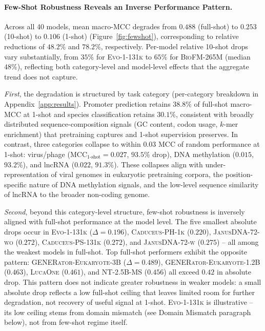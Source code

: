\documentclass{article}
\theoremstyle{plain}
\theoremstyle{definition}
\theoremstyle{remark}
\begin{document}
\paragraph{Few-Shot Robustness Reveals an Inverse Performance Pattern.}
Across all 40 models, mean macro-MCC degrades from $0.488$
(full-shot) to $0.253$ (10-shot) to $0.106$ (1-shot)
(Figure~\ref{fig:fewshot}), corresponding to relative reductions of
$48.2\%$ and $78.2\%$, respectively. Per-model relative 10-shot
drops vary substantially, from $35\%$ for \textsc{Evo-1-131k} to
$65\%$ for \textsc{BioFM-265M} (median $48\%$), reflecting both
category-level and model-level effects that the aggregate trend
does not capture.

\textit{First}, the degradation is structured by task category
(per-category breakdown in Appendix~\ref{app:results}). Promoter
prediction retains $38.8\%$ of full-shot macro-MCC at 1-shot and
species classification retains $30.1\%$, consistent with broadly
distributed sequence-composition signals (GC content, codon usage,
$k$-mer enrichment) that pretraining captures and 1-shot
supervision preserves. In contrast, three categories collapse to
within $0.03$ MCC of random performance at 1-shot: virus/phage
($\text{MCC}_{\text{1-shot}}=0.027$, $93.5\%$ drop), DNA methylation
($0.015$, $93.2\%$), and lncRNA ($0.022$, $91.3\%$). These collapses
align with under-representation of viral genomes in eukaryotic
pretraining corpora, the position-specific nature of DNA methylation
signals, and the low-level sequence similarity of lncRNA to the
broader non-coding genome.

\textit{Second}, beyond this category-level structure, few-shot
robustness is inversely aligned with full-shot performance at the
model level. The five smallest absolute drops occur in
\textsc{Evo-1-131k} ($\Delta = 0.196$), \textsc{Caduceus-PH-1k}
($0.220$), \textsc{JanusDNA-72-wo} ($0.272$),
\textsc{Caduceus-PS-131k} ($0.272$), and \textsc{JanusDNA-72-w}
($0.275$) -- all among the weakest models in full-shot. Top
full-shot performers exhibit the opposite pattern:
\textsc{GENERator-Eukaryote-3B} ($\Delta=0.489$),
\textsc{GENERator-Eukaryote-1.2B} ($0.463$), \textsc{LucaOne}
($0.461$), and \textsc{NT-2.5B-MS} ($0.456$) all exceed $0.42$ in
absolute drop. This pattern does not indicate greater robustness in
weaker models: a small absolute drop reflects a low full-shot
ceiling that leaves limited room for further degradation, not
recovery of useful signal at 1-shot. \textsc{Evo-1-131k} is
illustrative -- its low ceiling stems from domain mismatch
(see Domain Mismatch paragraph below), not from few-shot regime itself.
\end{document}
